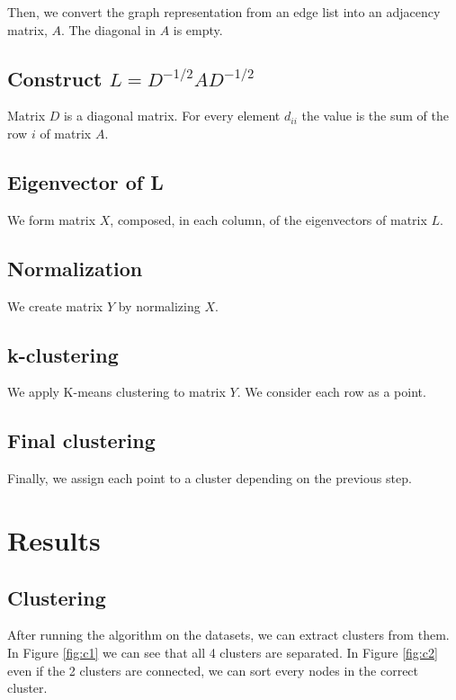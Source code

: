 \documentclass[]{article}
\begin{document}
Then, we convert the graph representation from an edge list into an adjacency matrix, $A$. The diagonal in $A$ is empty.

\subsection{Construct $L=D^{-1/2}AD^{-1/2}$ }

Matrix $D$ is a diagonal matrix. For every element $d_{ii}$ the value is the sum of the row $i$ of matrix $A$.

\subsection{Eigenvector of L}

We form matrix $X$, composed, in each column, of the eigenvectors of matrix $L$.

\subsection{Normalization}

We create matrix $Y$ by normalizing $X$.

\subsection{k-clustering}

We apply K-means clustering to matrix $Y$. We consider each row as a point.

\subsection{Final clustering}

Finally, we assign each point to a cluster depending on the previous step.

\pagebreak

\section{Results}

\subsection{Clustering}

After running the algorithm on the datasets, we can extract clusters from them. In Figure \ref{fig:c1} we can see that all 4 clusters are separated. In Figure \ref{fig:c2} even if the 2 clusters are connected, we can sort every nodes in the correct cluster.
\end{document}
